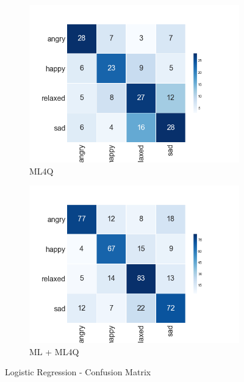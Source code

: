 \begin{figure}[H]
  \centering
  \begin{subfigure}[b]{0.49\linewidth}
    \includegraphics[width=\linewidth]{./chapters/chapter4/images/4Q/CM_LR.png}
    \caption{ML4Q}
  \end{subfigure}
  \begin{subfigure}[b]{0.49\linewidth}
   \includegraphics[width=\linewidth]{./chapters/chapter4/images/join/CM_LR.png}
    \caption{ML + ML4Q}
  \end{subfigure}
  \caption{Logistic Regression - Confusion Matrix}
  \label{fig:lr}
\end{figure}

